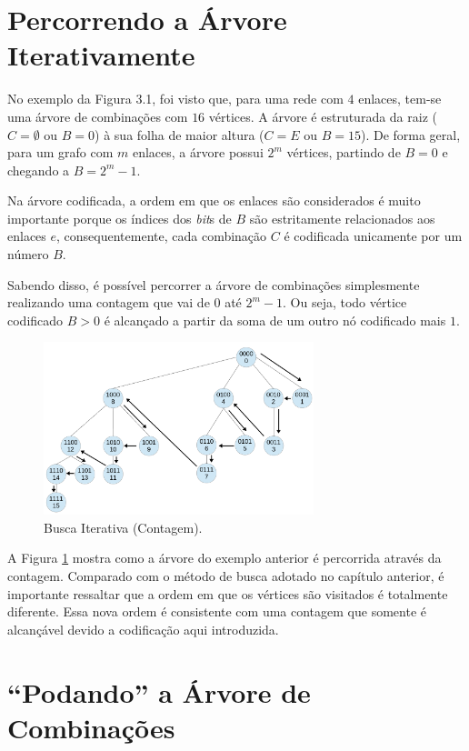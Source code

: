 \section{Percorrendo a Árvore Iterativamente}

No exemplo da Figura 3.1, foi visto que, para uma rede com $4$ enlaces, tem-se uma árvore de combinações com $16$ vértices. A árvore é estruturada da raiz ($C=\emptyset$ ou $B=0$) à sua folha de maior altura ($C=E$ ou $B=15$). De forma geral, para um grafo com $m$ enlaces, a árvore possui $2^m$ vértices, partindo de $B=0$ e chegando a $B=2^m-1$.

Na árvore codificada, a ordem em que os enlaces são considerados é muito importante porque os índices dos {\it bit}s de $B$ são estritamente relacionados aos enlaces $e$, consequentemente, cada combinação $C$ é codificada unicamente por um número $B$.

Sabendo disso, é possível percorrer a árvore de combinações simplesmente realizando uma contagem que vai de 0 até $2^m -1$. Ou seja, todo vértice codificado $B>0$ é alcançado a partir da soma de um outro nó codificado mais $1$.

\begin{figure}[htb]
\centering
\includegraphics[width=0.7\textwidth]{figs/buscaiterativa}
\caption[Busca Iterativa (Contagem).]
{Busca Iterativa (Contagem).}
\label{fig:buscaiterativa}
\end{figure}

A Figura \ref{fig:buscaiterativa} mostra como a árvore do exemplo anterior é percorrida através da contagem. Comparado com o método de busca adotado no capítulo anterior, é importante ressaltar que a ordem em que os vértices são visitados é totalmente diferente. Essa nova ordem é consistente com uma contagem que somente é alcançável devido a codificação aqui introduzida.

\section{“Podando” a Árvore de Combinações}

